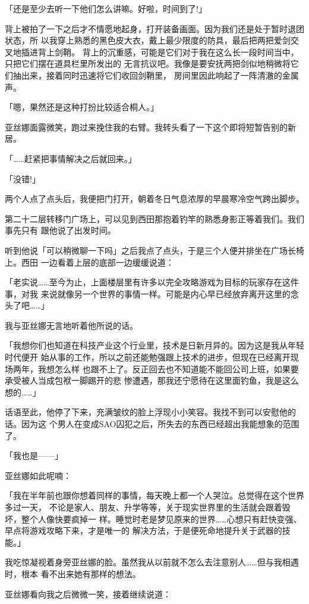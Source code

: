 \documentclass[11pt]{book}
\begin{document}
「还是至少去听一下他们怎么讲嘛。好啦，时间到了!」

背上被拍了一下之后才不情愿地起身，打开装备画面。因为我们还是处于暂时退团状态，所
以我穿上熟悉的黑色皮大衣，戴上最少限度的防具，最后把两把爱剑交叉地插进背上剑鞘。
背上的沉重感，可能是它们对于我在这么长一段时间当中，只把它们摆在道具栏里所发出的
无言抗议吧。我像是要安抚两把剑似地稍微将它们抽出来，接着同时迅速将它们收回剑鞘里，
房间里因此响起了一阵清澈的金属声。

「嗯，果然还是这种打扮比较适合桐人。」

亚丝娜面露微笑，跑过来挽住我的右臂。我转头看了一下这个即将短暂告别的新居。

「……赶紧把事情解决之后就回来。」

「没错!」

两个人点了点头后，我便把门打开，朝着冬日气息浓厚的早晨寒冷空气跨出脚步。

第二十二层转移门广场上，可以见到西田那抱着钓竿的熟悉身影正等着我们。我们事先只有
跟他说了出发时间。

听到他说「可以稍微聊一下吗」之后我点了点头，于是三个人便并排坐在广场长椅上。西田
一边看着上层的底部一边缓缓说道：

「老实说……至今为止，上面楼层里有许多以完全攻略游戏为目标的玩家存在这件事，对我
来说就像另一个世界的事情一样。可能是内心早已经放弃离开这里的念头了吧……」

我与亚丝娜无言地听着他所说的话。

「我想你们也知道在科技产业这个行业里，技术是日新月异的。因为这是我从年轻时代便开
始从事的工作，所以之前还能勉强跟上技术的进步，但现在已经离开现场两年，我想怎么样
也跟不上了。反正回去也不知道能不能回公司上班，如果要承受被人当成包袱一脚踢开的悲
惨遭遇，那我还宁愿待在这里面钓鱼，我是这么想的……」

话语至此，他停了下来，充满皱纹的脸上浮现小小笑容。我找不到可以安慰他的话。因为这
个男人在变成SAO囚犯之后，所失去的东西已经超出我能想象的范围了。

「我也是——」

亚丝娜如此呢喃：

「我在半年前也跟你想着同样的事情，每天晚上都一个人哭泣。总觉得在这个世界多过一天，
不论是家人、朋友、升学等等，关于现实世界里的生活就会跟着毁坏，整个人像快要疯掉一
样。睡觉时老是梦见原来的世界……心想只有赶快变强、早点将游戏攻略下来，才是唯一的
解决方法，于是便死命地提升关于武器的技能。」

我吃惊凝视着身旁亚丝娜的脸。虽然我从以前就不怎么去注意别人……但与我相遇时，根本
看不出来她有那样的想法。

亚丝娜看向我之后微微一笑，接着继续说道：
\end{document}
